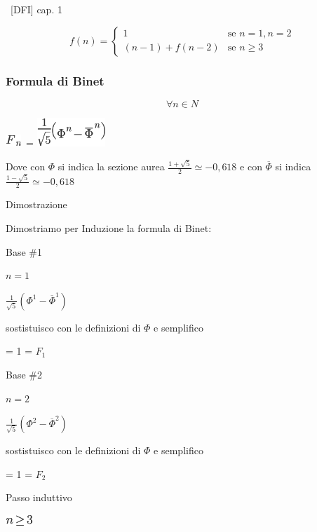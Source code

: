 \documentclass{article}
\begin{document}
{~{[}DFI{]} cap. 1}

\begin{equation}
f(n) = 
\begin{cases}
1 & \mbox{se } n=1,n=2 \\ 
(n-1)+f(n-2) & \mbox{se } n\geq3 
\end{cases}
\end{equation}

\hypertarget{h.uo8t8gg7vdaw}{\subsubsection{\texorpdfstring{{Formula di
Binet}}{Formula di Binet}}\label{h.uo8t8gg7vdaw}}

\begin{equation}
\forall n \in N
\end{equation}

\includegraphics{images/image1.png}{~=
}\includegraphics{images/image4.png}

Dove con $\Phi$ si indica la sezione aurea $\frac{1+\sqrt{5}}{2} \simeq -0,618$ e con $\overline{\Phi}$ si indica $\frac{1-\sqrt{5}}{2} \simeq -0,618$

{Dimostrazione}

{Dimostriamo per Induzione la formula di Binet:}

{Base \#1}

{$n = 1$}

$\frac{1}{\sqrt{5}}(\Phi^1-\overline{\Phi}^1)$

{sostistuisco con le definizioni di $\Phi$ e semplifico}

{= 1 = $F_1$}

{Base \#2}

{$n = 2$}

$\frac{1}{\sqrt{5}}(\Phi^2-\overline{\Phi}^2)$

{sostistuisco con le definizioni di $\Phi$ e semplifico}

{= 1 = $F_2$}

{Passo induttivo}

\includegraphics{images/image13.png}
\end{document}

